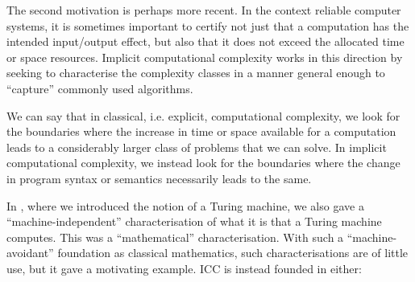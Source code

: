 

The second motivation is perhaps more recent. In the context reliable computer
systems, it is sometimes important to certify not just that a computation has
the intended input/output effect, but also that it does not exceed the
allocated time or space resources. Implicit computational complexity works in
this direction by seeking to characterise the complexity classes in a manner
general enough to ``capture'' commonly used algorithms.

We can say that in classical, i.e. explicit, computational complexity, we look
for the boundaries where the increase in time or space available for a
computation leads to a considerably larger class of problems that we can solve.
In implicit computational complexity, we instead look for the boundaries where
the change in program syntax or semantics necessarily leads to the same.

In , where we introduced the notion of a Turing machine,
we also gave a ``machine-independent'' characterisation of what it is that a
Turing machine computes. This was a ``mathematical'' characterisation. With
such a ``machine-avoidant'' foundation as classical mathematics, such
characterisations are of little use, but it gave a motivating example. ICC is
instead founded in either:

